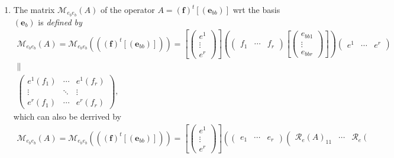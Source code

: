 \documentclass[aps,preprint]{revtex4}
\begin{document}
\begin{enumerate}
\begin{enumerate}
\item The matrix $\mathcal{M}_{e_{b}e_{b}}\left( A\right) $ of the operator $%
A=\left( \boldsymbol{f}\right) ^{t}\left[ \left( \boldsymbol{e}_{bb}\right) %
\right] $ wrt the basis $\left( \boldsymbol{e}_{b}\right) $ is \emph{defined
by} 
\begin{gather}
\mathcal{M}_{e_{b}e_{b}}\left( A\right) =\mathcal{M}_{e_{b}e_{b}}\left(
\left( \left( \boldsymbol{f}\right) ^{t}\left[ \left( \boldsymbol{e}%
_{bb}\right) \right] \right) \right) =\left[ \left( 
\begin{array}{c}
e^{1} \\ 
\vdots \\ 
e^{r}%
\end{array}%
\right) \right] \left( \left( 
\begin{array}{ccc}
f_{1} & \cdots & f_{r}%
\end{array}%
\right) \left[ \left( 
\begin{array}{c}
e_{bb1} \\ 
\vdots \\ 
e_{bbr}%
\end{array}%
\right) \right] \right) \left( 
\begin{array}{ccc}
e^{1} & \cdots & e^{r}%
\end{array}%
\right) \\
\parallel \\
\left( 
\begin{array}{ccc}
e^{1}\left( f_{1}\right) & \cdots & e^{1}\left( f_{r}\right) \\ 
\vdots & \ddots & \vdots \\ 
e^{r}\left( f_{1}\right) & \cdots & e^{r}\left( f_{r}\right)%
\end{array}%
\right) ,
\end{gather}%
which can also be derrived by 
\begin{gather}
\mathcal{M}_{e_{b}e_{b}}\left( A\right) =\mathcal{M}_{e_{b}e_{b}}\left(
\left( \left( \boldsymbol{f}\right) ^{t}\left[ \left( \boldsymbol{e}%
_{bb}\right) \right] \right) \right) =\left[ \left( 
\begin{array}{c}
e^{1} \\ 
\vdots \\ 
e^{r}%
\end{array}%
\right) \right] \left( \left( 
\begin{array}{ccc}
e_{1} & \cdots & e_{r}%
\end{array}%
\right) \left( 
\begin{array}{ccc}
\mathcal{R}_{e}\left( A\right) _{11} & \cdots & \mathcal{R}_{e}\left(

\end{array}
\end{gather}
\end{enumerate}
\end{enumerate}
\end{document}
